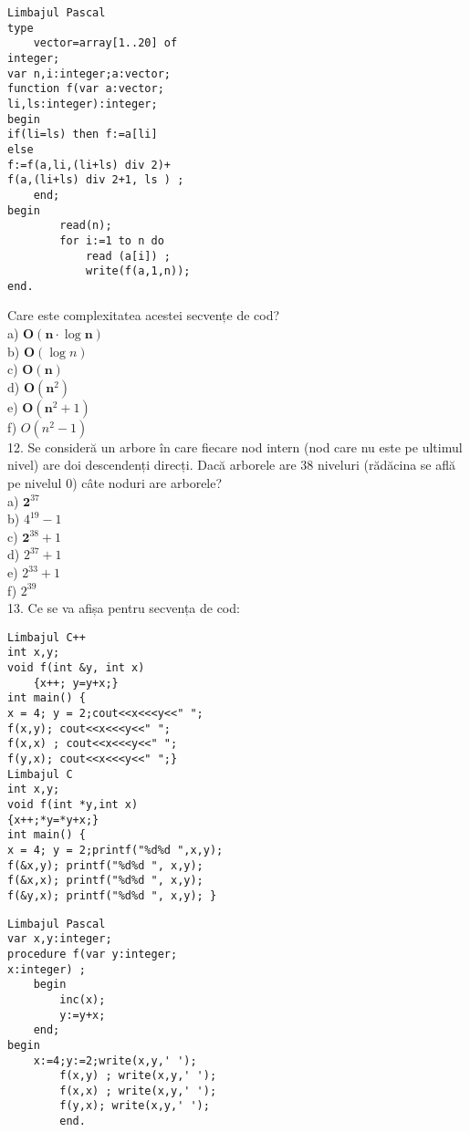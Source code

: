 \begin{verbatim}
Limbajul Pascal
type
    vector=array[1..20] of
integer;
var n,i:integer;a:vector;
function f(var a:vector;
li,ls:integer):integer;
begin
if(li=ls) then f:=a[li]
else
f:=f(a,li,(li+ls) div 2)+
f(a,(li+ls) div 2+1, ls ) ;
    end;
begin
        read(n);
        for i:=1 to n do
            read (a[i]) ;
            write(f(a,1,n));
end.
\end{verbatim}

Care este complexitatea acestei secvențe de cod?\\
a) $\mathbf{O}(\mathbf{n} \cdot \log \mathbf{n})$\\
b) $\mathbf{O}(\log n)$\\
c) $\mathbf{O}(\mathbf{n})$\\
d) $\mathbf{O}\left(\mathbf{n}^{2}\right)$\\
e) $\mathbf{O}\left(\mathbf{n}^{2}+1\right)$\\
f) $O\left(n^{2}-1\right)$\\
12. Se consideră un arbore în care fiecare nod intern (nod care nu este pe ultimul nivel) are doi descendenți direcți. Dacă arborele are 38 niveluri (rădăcina se află pe nivelul 0) câte noduri are arborele?\\
a) $\mathbf{2}^{37}$\\
b) $4^{19}-1$\\
c) $\mathbf{2}^{38}+1$\\
d) $2^{37}+1$\\
e) $2^{33}+1$\\
f) $2^{39}$\\
13. Ce se va afișa pentru secvența de cod:

\begin{verbatim}
Limbajul C++
int x,y;
void f(int &y, int x)
    {x++; y=y+x;}
int main() {
x = 4; y = 2;cout<<x<<<y<<" ";
f(x,y); cout<<x<<<y<<" ";
f(x,x) ; cout<<x<<<y<<" ";
f(y,x); cout<<x<<<y<<" ";}
Limbajul C
int x,y;
void f(int *y,int x)
{x++;*y=*y+x;}
int main() {
x = 4; y = 2;printf("%d%d ",x,y);
f(&x,y); printf("%d%d ", x,y);
f(&x,x); printf("%d%d ", x,y);
f(&y,x); printf("%d%d ", x,y); }
\end{verbatim}

\begin{verbatim}
Limbajul Pascal
var x,y:integer;
procedure f(var y:integer;
x:integer) ;
    begin
        inc(x);
        y:=y+x;
    end;
begin
    x:=4;y:=2;write(x,y,' ');
        f(x,y) ; write(x,y,' ');
        f(x,x) ; write(x,y,' ');
        f(y,x); write(x,y,' ');
        end.
\end{verbatim}

